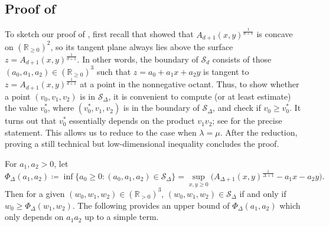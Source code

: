 \documentclass{article}
\numberwithin{equation}{section}
\theoremstyle{plain}
\theoremstyle{definition}
\theoremstyle{remark} %
\newcommand{\defeq}{\coloneqq}
\newcommand{\RR}{\mathbb{R}}
\newcommand{\calS}{\mathcal{S}}
\begin{document}
\subsection{Proof of \texorpdfstring{}{Lemma~\ref{lem:Sn-membership-separately}}}
To sketch our proof of , first recall that  showed that \(A_{d+1}(x,y)^{\frac{1}{d+1}}\) is concave on \((\RR_{\ge0})^2\), so its tangent plane always lies above the surface \(z=A_{d+1}(x,y)^{\frac{1}{d+1}}\). In other words, the boundary of $\calS_d$ consists of those $(a_0,a_1,a_2)\in (\RR_{\geq 0})^3$ such that \(z=a_0+a_1x+a_2y\) is tangent to \(z=A_{d+1}(x,y)^{\frac{1}{d+1}}\) at a point in the nonnegative octant. Thus, to show whether a point $(v_0,v_1,v_2)$ is in $\calS_\Delta$, it is convenient to compute (or at least estimate) the value $v_0^*$, where $(v_0^*,v_1,v_2)$ is in the boundary of $\calS_\Delta$, and check if \(v_0\ge v_0^*\).
It turns out that $v_0^*$ essentially depends on the product $v_1v_2$; see  for the precise statement. This allows us to reduce  to the case when \(\lambda=\mu\).
After the reduction, proving a still technical but low-dimensional inequality concludes the proof.


For \(a_1,a_2>0\), let
\begin{equation}\label{eq:min-a0-when-a1-a2-given}
    \Phi_\Delta(a_1,a_2)\defeq \inf \{a_0\ge0 : (a_0,a_1,a_2)\in \calS_\Delta\}
    = \sup_{x,y\ge0} \bigl( A_{\Delta+1}(x,y)^{\frac{1}{\Delta+1}} - a_1x - a_2y \bigr).
\end{equation}
Then for a given \((w_0,w_1,w_2)\in (\RR_{>0})^3\), \((w_0,w_1,w_2)\in\calS_\Delta\) if and only if \(w_0\ge \Phi_\Delta(w_1,w_2)\). The following  provides an upper bound of \(\Phi_\Delta(a_1,a_2)\) which only depends on \(a_1a_2\) up to a simple term.
\end{document}
